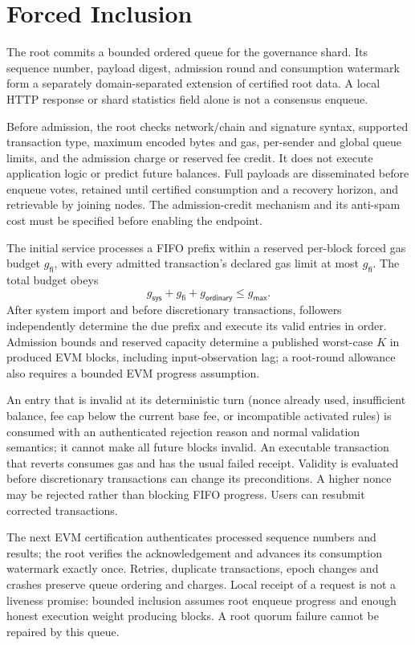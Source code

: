\section{Forced Inclusion}\label{app:gov-forced-inclusion}

The root commits a bounded ordered queue for the governance shard. Its sequence number, payload digest, admission round and consumption watermark form a separately domain-separated extension of certified root data. A local HTTP response or shard statistics field alone is not a consensus enqueue.

Before admission, the root checks network/chain and signature syntax, supported transaction type, maximum encoded bytes and gas, per-sender and global queue limits, and the admission charge or reserved fee credit. It does not execute application logic or predict future balances. Full payloads are disseminated before enqueue votes, retained until certified consumption and a recovery horizon, and retrievable by joining nodes. The admission-credit mechanism and its anti-spam cost must be specified before enabling the endpoint.

The initial service processes a FIFO prefix within a reserved per-block forced gas budget $g_\mathsf{fi}$, with every admitted transaction's declared gas limit at most $g_\mathsf{fi}$. The total budget obeys
\[
 g_\mathsf{sys}+g_\mathsf{fi}+g_\mathsf{ordinary}\le g_\mathsf{max}.
\]
After system import and before discretionary transactions, followers independently determine the due prefix and execute its valid entries in order. Admission bounds and reserved capacity determine a published worst-case $K$ in produced EVM blocks, including input-observation lag; a root-round allowance also requires a bounded EVM progress assumption.

An entry that is invalid at its deterministic turn (nonce already used, insufficient balance, fee cap below the current base fee, or incompatible activated rules) is consumed with an authenticated rejection reason and normal validation semantics; it cannot make all future blocks invalid. An executable transaction that reverts consumes gas and has the usual failed receipt. Validity is evaluated before discretionary transactions can change its preconditions. A higher nonce may be rejected rather than blocking FIFO progress. Users can resubmit corrected transactions.

The next EVM certification authenticates processed sequence numbers and results; the root verifies the acknowledgement and advances its consumption watermark exactly once. Retries, duplicate transactions, epoch changes and crashes preserve queue ordering and charges. Local receipt of a request is not a liveness promise: bounded inclusion assumes root enqueue progress and enough honest execution weight producing blocks. A root quorum failure cannot be repaired by this queue.

